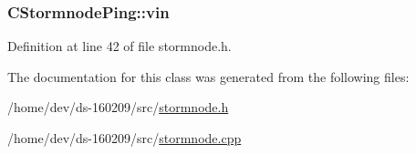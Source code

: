\hypertarget{class_c_stormnode_ping_a83adfd5f2331b88deb60e44df9c878d9}{}
\subsubsection[{vin}]{ C\+Stormnode\+Ping\+::vin}\label{class_c_stormnode_ping_a83adfd5f2331b88deb60e44df9c878d9}


Definition at line 42 of file stormnode.\+h.



The documentation for this class was generated from the following files\+:\begin{DoxyCompactItemize}
\item 
/home/dev/ds-\/160209/src/\hyperlink{stormnode_8h}{stormnode.\+h}\item 
/home/dev/ds-\/160209/src/\hyperlink{stormnode_8cpp}{stormnode.\+cpp}\end{DoxyCompactItemize}
